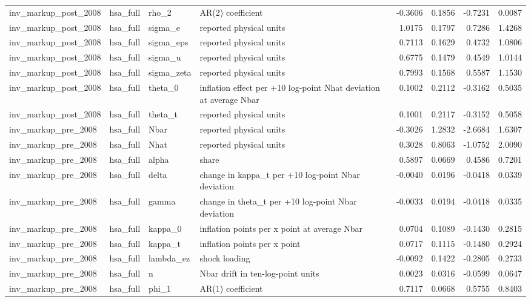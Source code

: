 \begin{tabular}{llllrrrr}
inv\_markup\_post\_2008 & hsa\_full & rho\_2 & AR(2) coefficient & -0.3606 & 0.1856 & -0.7231 & 0.0087 \\
inv\_markup\_post\_2008 & hsa\_full & sigma\_e & reported physical units & 1.0175 & 0.1797 & 0.7286 & 1.4268 \\
inv\_markup\_post\_2008 & hsa\_full & sigma\_eps & reported physical units & 0.7113 & 0.1629 & 0.4732 & 1.0806 \\
inv\_markup\_post\_2008 & hsa\_full & sigma\_u & reported physical units & 0.6775 & 0.1479 & 0.4549 & 1.0144 \\
inv\_markup\_post\_2008 & hsa\_full & sigma\_zeta & reported physical units & 0.7993 & 0.1568 & 0.5587 & 1.1530 \\
inv\_markup\_post\_2008 & hsa\_full & theta\_0 & inflation effect per +10 log-point Nhat deviation at average Nbar & 0.1002 & 0.2112 & -0.3162 & 0.5035 \\
inv\_markup\_post\_2008 & hsa\_full & theta\_t & reported physical units & 0.1001 & 0.2117 & -0.3152 & 0.5058 \\
inv\_markup\_pre\_2008 & hsa\_full & Nbar & reported physical units & -0.3026 & 1.2832 & -2.6684 & 1.6307 \\
inv\_markup\_pre\_2008 & hsa\_full & Nhat & reported physical units & 0.3028 & 0.8063 & -1.0752 & 2.0090 \\
inv\_markup\_pre\_2008 & hsa\_full & alpha & share & 0.5897 & 0.0669 & 0.4586 & 0.7201 \\
inv\_markup\_pre\_2008 & hsa\_full & delta & change in kappa\_t per +10 log-point Nbar deviation & -0.0040 & 0.0196 & -0.0418 & 0.0339 \\
inv\_markup\_pre\_2008 & hsa\_full & gamma & change in theta\_t per +10 log-point Nbar deviation & -0.0033 & 0.0194 & -0.0418 & 0.0335 \\
inv\_markup\_pre\_2008 & hsa\_full & kappa\_0 & inflation points per x point at average Nbar & 0.0704 & 0.1089 & -0.1430 & 0.2815 \\
inv\_markup\_pre\_2008 & hsa\_full & kappa\_t & inflation points per x point & 0.0717 & 0.1115 & -0.1480 & 0.2924 \\
inv\_markup\_pre\_2008 & hsa\_full & lambda\_ez & shock loading & -0.0092 & 0.1422 & -0.2805 & 0.2733 \\
inv\_markup\_pre\_2008 & hsa\_full & n & Nbar drift in ten-log-point units & 0.0023 & 0.0316 & -0.0599 & 0.0647 \\
inv\_markup\_pre\_2008 & hsa\_full & phi\_1 & AR(1) coefficient & 0.7117 & 0.0668 & 0.5755 & 0.8403 \\

\end{tabular}
